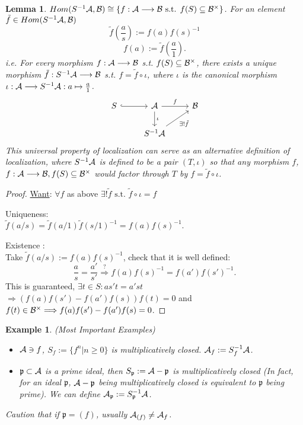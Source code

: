 \documentclass[11pt]{article}
\newtheorem{lemma}[thm]{Lemma}
\newtheorem{ex}[thm]{Example}
\newcommand{\scp}{{\mathfrak p}}
\newcommand{\cala}{{\cal A}}
\newcommand{\calb}{{\cal B}}
\newcommand{\Lrta}{\Longrightarrow}
\newcommand{\lrta}{\longrightarrow}
\begin{document}
\begin{lemma}
$Hom(S^{-1}\cala,\calb)\cong \{f:\cala\lrta \calb\text{ s.t. } f(S)\subseteq \calb^{\times}\}$. 
For an element $\tilde{f}\in Hom(S^{-1}\cala,\calb)$
$$
\tilde{f}\left(\frac{a}{s}\right):=f(a)f(s)^{-1}
$$
$$
f(a):=\tilde{f}\left(\frac{a}{1}\right).
$$
i.e. For every morphism $f:\cala\lrta\calb$ s.t. $f(S)\subseteq \calb^{\times}$, there exists a unique morphism $\tilde{f}:S^{-1}\cala\lrta \calb$ s.t. $f=\tilde{f}\circ\iota$, where $\iota $ is the canonical morphism $\iota:\cala\lrta S^{-1}\cala:a\mapsto \frac{a}{1}$.
\[
\begin{tikzcd}
S\ar[r,hook] &\cala  \arrow[r,"f"] \arrow[d,"\iota"] & \calb \\
&S^{-1}\cala\arrow[ur,swap,"\exists !\tilde{f}"]  &    
\end{tikzcd}
\]
This universal property of localization can serve as an alternative definition of localization, where $S^{-1}\cala$ is defined to be a pair $(T,\iota)$ so that any morphism $f$, $f:\cala\lrta \calb,f(S)\subseteq\calb^\times$ would factor through $T$ by $f=\tilde{f}\circ\iota$.
\end{lemma}
\begin{proof}
\underline{Want}: $\forall f$ as above $\exists ! \tilde{f}\text{ s.t. } \tilde{f}\circ\iota=f$

Uniqueness:\\
$\tilde{f}(a/s)=\tilde{f}(a/1)\tilde{f}(s/1)^{-1}=f(a)f(s)^{-1}$.

Existence :\\
Take $\tilde{f}(a/s):=f(a)f(s)^{-1}$, check that it is well defined:
$$
\frac{a}{s}=\frac{a'}{s'}\overset{?}{\Lrta} f(a)f(s)^{-1}=f(a')f(s')^{-1}.
$$
This is guaranteed, $\exists t\in S: as' t=a's t$ $\Lrta (f(a)f(s')-f(a')f(s))f(t)=0$ and $f(t)\in \calb^{\times}\Lrta f(a)f(s')-f(a')f(s)=0$.
\end{proof}

\begin{ex}
(Most Important Examples)
\begin{itemize}
    \item 
    $\cala\ni f$, $S_f:=\{f^n|n\geq 0\}$ is multiplicatively closed. $\cala_f:=S^{-1}_f\cala$.
    \item
    $\scp\subset \cala$ is a prime ideal, then $S_\scp:=\cala-\scp$ is multiplicatively closed (In fact, for an ideal $\scp$, $\cala-\scp$ being multiplicatively closed is equivalent to $\scp$ being prime). We can define 
    $\cala_{\scp}:=S_{\scp}^{-1}\cala$.
\end{itemize}
Caution that if $\scp=(f)$, usually $\cala_{(f)}\neq \cala_{f}$.
\end{ex}
\end{document}

